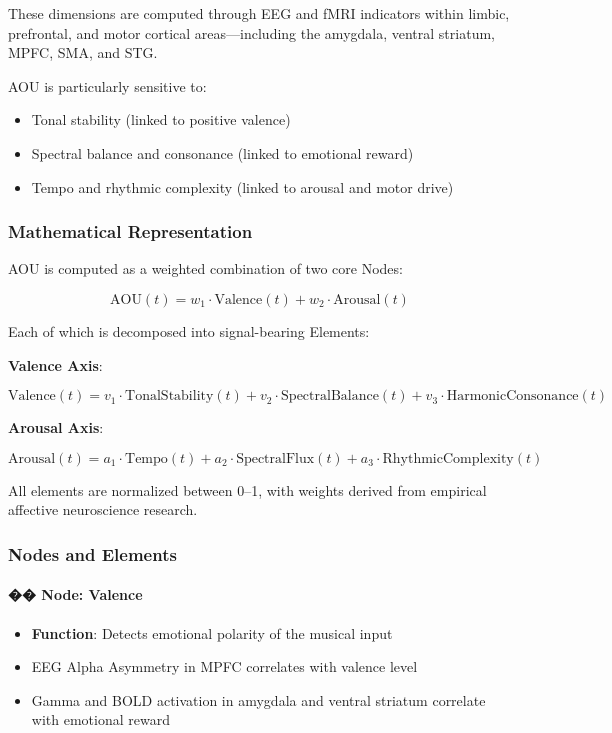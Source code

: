 \documentclass[10pt]{article}
\begin{document}
These dimensions are computed through EEG and fMRI indicators within limbic, prefrontal, and motor cortical areas—including the amygdala, ventral striatum, MPFC, SMA, and STG.

AOU is particularly sensitive to:

\begin{itemize}
    \item Tonal stability (linked to positive valence)
    \item Spectral balance and consonance (linked to emotional reward)
    \item Tempo and rhythmic complexity (linked to arousal and motor drive)
\end{itemize}

\subsubsection*{Mathematical Representation}

AOU is computed as a weighted combination of two core Nodes:

\[
\text{AOU}(t) = w_1 \cdot \text{Valence}(t) + w_2 \cdot \text{Arousal}(t)
\]

Each of which is decomposed into signal-bearing Elements:

\textbf{Valence Axis}:

\[
\text{Valence}(t) = v_1 \cdot \text{TonalStability}(t) + v_2 \cdot \text{SpectralBalance}(t) + v_3 \cdot \text{HarmonicConsonance}(t)
\]

\textbf{Arousal Axis}:

\[
\text{Arousal}(t) = a_1 \cdot \text{Tempo}(t) + a_2 \cdot \text{SpectralFlux}(t) + a_3 \cdot \text{RhythmicComplexity}(t)
\]

All elements are normalized between 0–1, with weights derived from empirical affective neuroscience research.

\subsubsection*{Nodes and Elements}

\paragraph{�� Node: Valence}

\begin{itemize}
    \item \textbf{Function}: Detects emotional polarity of the musical input
    \item EEG Alpha Asymmetry in MPFC correlates with valence level
    \item Gamma and BOLD activation in amygdala and ventral striatum correlate with emotional reward
\end{itemize}
\end{document}
